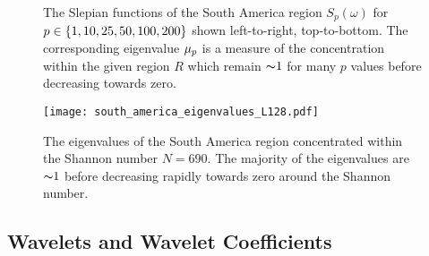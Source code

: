 \begin{figure}[htp]
	\centering
	\hfill
	\newline
	\hfill
	\newline
	\hfill
	\caption{
		The Slepian functions of the South America region \(S_p(\omega)\) for \(p \in \{1, 10, 25, 50, 100, 200\}\) shown left-to-right, top-to-bottom.
		The corresponding eigenvalue \({\mu}_{p}\) is a measure of the concentration within the given region \(R\) which remain \({\thicksim}1\) for many \(p\) values before decreasing towards zero.
	}\label{fig:chapter3_eigenfunctions}
\end{figure}

\begin{figure}[htp]
	\centering
	\texttt{[image: south\_america\_eigenvalues\_L128.pdf]}
	\caption{
		The eigenvalues of the South America region concentrated within the Shannon number \(N=690\).
		The majority of the eigenvalues are \({\thicksim}1\) before decreasing rapidly towards zero around the Shannon number.
	}\label{fig:chapter3_eigenvalues}
\end{figure}

\subsection{Wavelets and Wavelet Coefficients}\label{sec:chapter3_south_america_wavelets}

